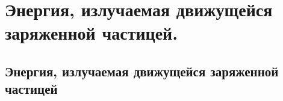 \chapter{Энергия, излучаемая движущейся заряженной частицей.}

\section{Энергия, излучаемая движущейся заряженной частицей}
